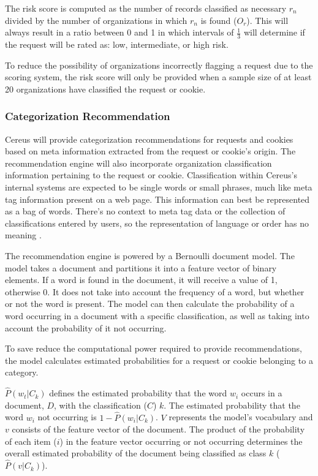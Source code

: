 The risk score is computed as the number of records classified as necessary \( r_n \) divided by the number of organizations in which \(r_n\) is found (\( O_r \)). This will always result in a ratio between 0 and 1 in which intervals of \(\frac{1}{3}\) will determine if the request will be rated as: low, intermediate, or high risk.

To reduce the possibility of organizations incorrectly flagging a request due to the scoring system, the risk score will only be provided when a sample size of at least 20 organizations have classified the request or cookie.

\subsubsection*{Categorization Recommendation}

Cereus will provide categorization recommendations for requests and cookies based on meta information extracted from the request or cookie's origin. The recommendation engine will also incorporate organization classification information pertaining to the request or cookie. Classification within Cereus's internal systems are expected to be single words or small phrases, much like meta tag information present on a web page. This information can best be represented as a bag of words. There's no context to meta tag data or the collection of classifications entered by users, so the representation of language or order has no meaning \cite{manning.2008}.

The recommendation engine is powered by a Bernoulli document model. The model takes a document and partitions it into a feature vector of binary elements. If a word is found in the document, it will receive a value of 1, otherwise 0. It does not take into account the frequency of a word, but whether or not the word is present. The model can then calculate the probability of a word occurring in a document with a specific classification, as well as taking into account the probability of it not occurring.

To save reduce the computational power required to provide recommendations, the model calculates estimated probabilities for a request or cookie belonging to a category.

\(\hat{P}(w_{t}|C_{k})\) defines the estimated probability that the word \(w_{i}\) occurs in a document, \(D\), with the classification (\(C\)) \(k\). The estimated probability that the word \(w_{i}\) not occurring is \(1 - \hat{P}(w_{i}|C_{k})\). \(V\) represents the model's vocabulary and \(v\) consists of the feature vector of the document. The product of the probability of each item (\(i\)) in the feature vector occurring or not occurring determines the overall estimated probability of the document being classified as class \(k\) (\(\hat{P}(v|C_{k})\)).

